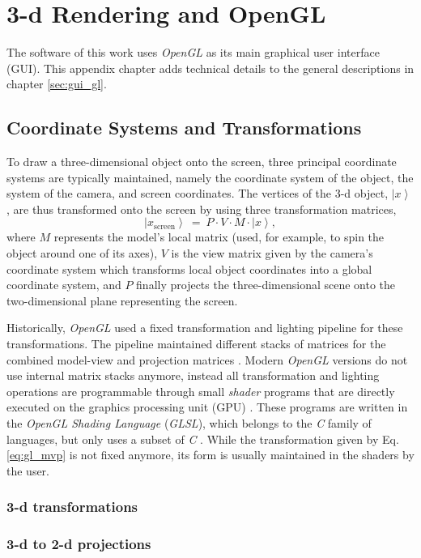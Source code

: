 %
%

\chapter{3-d Rendering and OpenGL}
\label{ch:gl}

The software of this work uses \textit{OpenGL} \cite{web_OpenGL} as its main graphical user interface (GUI).
This appendix chapter adds technical details to the general descriptions in chapter \ref{sec:gui_gl}.



\section{Coordinate Systems and Transformations}

To draw a three-dimensional object onto the screen, three principal coordinate systems are typically maintained,
namely the coordinate system of the object, the system of the camera, and screen coordinates.
The vertices of the 3-d object, $\left|x\right>$ , are thus transformed onto the screen by using three
transformation matrices,
\begin{equation}
	\left|x_{\mathrm{screen}}\right> \ =\ P \cdot V \cdot  M \cdot  \left| x \right>,
	\label{eq:gl_mvp}
\end{equation}
where $M$ represents the model's local matrix (used, for example, to spin the object around one of its axes),
$V$ is the view matrix given by the camera's coordinate system which transforms local object coordinates into
a global coordinate system, and $P$ finally projects the three-dimensional scene onto the two-dimensional plane
representing the screen.

Historically, \textit{OpenGL} used a fixed transformation and lighting pipeline \cite{wiki_gl_history} for
these transformations. The pipeline maintained different stacks of matrices for the combined model-view and
projection matrices \cite{web_gl_matrixmode}.
Modern \textit{OpenGL} versions do not use internal matrix stacks anymore, instead all transformation
and lighting operations are programmable through small \textit{shader} programs that are directly executed on
the graphics processing unit (GPU) \cite{wiki_gl_history}. These programs are written in the
\textit{OpenGL Shading Language} (\textit{GLSL}), which belongs to the \textit{C} family of languages, but
only uses a subset of \textit{C} \cite{wiki_glsl}.
While the transformation given by Eq. \ref{eq:gl_mvp} is not fixed anymore, its form is usually maintained
in the shaders by the user.



\subsection{3-d transformations}



\subsection{3-d to 2-d projections}
